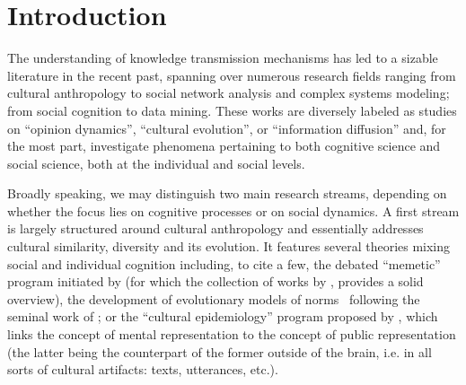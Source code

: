 
\section{Introduction} %

The understanding of knowledge transmission mechanisms has led to a sizable literature in the recent past, spanning over numerous research fields ranging from cultural anthropology to social network analysis and complex systems modeling; from social cognition to data mining. These works are diversely labeled as studies on ``opinion dynamics'', ``cultural evolution'', or ``information diffusion'' and, for the most part, investigate phenomena pertaining to both cognitive science and social science, both at the individual and social levels.

Broadly speaking, we may distinguish two main research streams, depending on whether the focus lies on cognitive processes or on social dynamics. A first stream is largely structured around cultural anthropology and essentially addresses cultural similarity, diversity and its evolution. It features several theories mixing social and individual cognition including, to cite a few, the debated ``memetic'' program initiated by \citet{Dawkins76} (for which the collection of works by \citealp{Aunger00}, provides a solid overview), the development of evolutionary models of norms~\citep[see for instance][]{Ehrlich05} following the seminal work of \citet{Boyd85}; or the ``cultural epidemiology'' program proposed by \citet{sper:expl}, which links the concept of mental representation to the concept of public representation (the latter being the counterpart of the former outside of the brain, \hbox{i.e.} in all sorts of cultural artifacts: texts, utterances, etc.).

